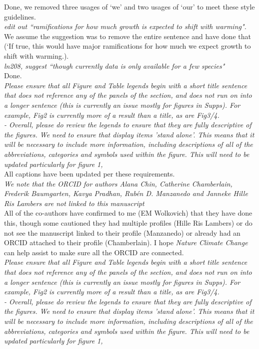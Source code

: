 \documentclass[11pt]{article}
\begin{document}
Done, we removed three usages of `we' and two usages of `our' to meet these style guidelines.\\

\emph{edit out ``ramifications for how much growth is expected to shift with warming".}\\

We assume the suggestion was to remove the entire sentence and have done that (`If true, this would have major ramifications for how much we expect growth to shift with warming.).\\

\emph{ln208, suggest ``though currently data is only available for a few species"}\\

Done. \\

\emph{Please ensure that all Figure and Table legends begin with a short title sentence that does not reference any of the panels of the section, and does not run on into a longer sentence (this is currently an issue mostly for figures in Supps). For example, Fig2 is currently more of a result than a title, as are Fig3/4.\\
- Overall, please do review the legends to ensure that they are fully descriptive of the figures. We need to ensure that display items 'stand alone'. This means that it will be necessary to include more information, including descriptions of all of the abbreviations, categories and symbols used within the figure. This will need to be updated particularly for figure 1,}\\

All captions have been updated per these requirements. \\

\emph{We note that the ORCID for authors Alana Chin, Catherine Chamberlain, Frederik Baumgarten, Kavya Pradhan, Rubén D. Manzanedo and Janneke Hille Ris Lambers are not linked to this manuscript}\\

All of the co-authors have confirmed to me (EM Wolkovich) that they have done this, though some cautioned they had multiple profiles (Hille Ris Lambers) or do not see the manuscript linked to their profile (Manzanedo) or already had an ORCID attached to their profile (Chamberlain). I hope \emph{Nature Climate Change} can help assist to make sure all the ORCID are connected.\\

\emph{Please ensure that all Figure and Table legends begin with a short title sentence that does not reference any of the panels of the section, and does not run on into a longer sentence (this is currently an issue mostly for figures in Supps). For example, Fig2 is currently more of a result than a title, as are Fig3/4.\\
- Overall, please do review the legends to ensure that they are fully descriptive of the figures. We need to ensure that display items 'stand alone'. This means that it will be necessary to include more information, including descriptions of all of the abbreviations, categories and symbols used within the figure. This will need to be updated particularly for figure 1,}\\
\end{document}

